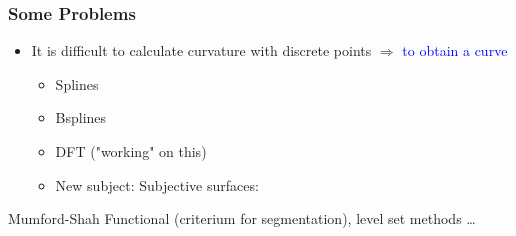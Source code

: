 \documentclass{beamer}
\begin{document}
\begin{frame}
\frametitle{Some Problems}
\begin{itemize}
\item It is difficult to calculate curvature with discrete points $\Rightarrow$ \textcolor{blue}{to obtain a curve}
\begin{itemize}
    \item Splines
    \item Bsplines
    \item DFT ("working" on this)
    \item New subject: Subjective surfaces: 
\end{itemize}
\end{itemize}
\end{frame}

\begin{frame}



Mumford-Shah Functional (criterium for segmentation), level set methods \ldots
\end{frame}
\end{document}
